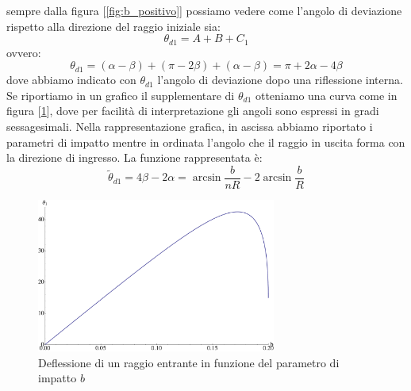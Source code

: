 \documentclass[a4paper,10pt,oneside]{article}
\begin{document}
sempre dalla figura [\ref{fig:b_positivo}] possiamo vedere come l'angolo di deviazione rispetto alla direzione del raggio iniziale sia:
\begin{equation}
 \theta_{d1}=A+B+C_1
\end{equation}
ovvero:
\begin{equation}
 \theta_{d1}=(\alpha-\beta)+(\pi-2\beta)+(\alpha-\beta)=\pi+2\alpha-4\beta
\end{equation}
dove abbiamo indicato con $\theta_{d1}$ l'angolo di deviazione dopo una riflessione interna.
Se riportiamo in un grafico il supplementare di $\theta_{d1}$ otteniamo una curva come in figura [\ref{fig:una_riflessione}], dove per facilità di interpretazione gli angoli sono espressi in gradi sessagesimali.
Nella rappresentazione grafica, in ascissa abbiamo riportato i parametri di impatto mentre in ordinata l'angolo che il raggio in uscita forma con la direzione di ingresso. La funzione rappresentata è:
\begin{equation}\label{angolo_1}
 \tilde{\theta}_{d1}=4\beta-2\alpha=\arcsin\frac{b}{nR}-2\arcsin\frac b R
\end{equation}


\begin{figure}[H]
 \centering
 \includegraphics[width=0.7\textwidth]{./Immagini/una_riflessione.pdf}
 \caption{Deflessione di un raggio entrante in funzione del parametro di impatto $b$}
 \label{fig:una_riflessione}
\end{figure}
\end{document}
